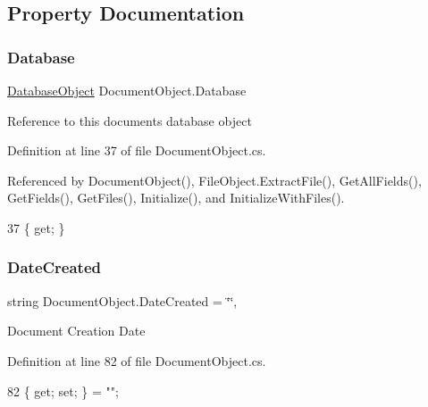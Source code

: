 \subsection{Property Documentation}
\mbox{\label{class_document_object_a69d5338c9835f748490323d2950eed09}} 
\subsubsection{\texorpdfstring{Database}{Database}}
{\footnotesize\ttfamily \mbox{\hyperlink{class_database_object}{Database\+Object}} Document\+Object.\+Database\hspace{0.3cm}{\ttfamily [get]}}



Reference to this documents database object 



Definition at line 37 of file Document\+Object.\+cs.



Referenced by Document\+Object(), File\+Object.\+Extract\+File(), Get\+All\+Fields(), Get\+Fields(), Get\+Files(), Initialize(), and Initialize\+With\+Files().


\begin{DoxyCode}
37 \{ \textcolor{keyword}{get}; \}
\end{DoxyCode}
\mbox{\label{class_document_object_a819cb8baad094f6e5990c54ec1eee8b0}} 
\subsubsection{\texorpdfstring{Date\+Created}{DateCreated}}
{\footnotesize\ttfamily string Document\+Object.\+Date\+Created = \char`\"{}\char`\"{}\hspace{0.3cm}{\ttfamily [get]}, {\ttfamily [set]}}



Document Creation Date 



Definition at line 82 of file Document\+Object.\+cs.


\begin{DoxyCode}
82 \{ \textcolor{keyword}{get}; \textcolor{keyword}{set}; \} = \textcolor{stringliteral}{""};
\end{DoxyCode}
\mbox{\label{class_document_object_a87ba1b3ac1b74b104972c25b245c504b}} 

